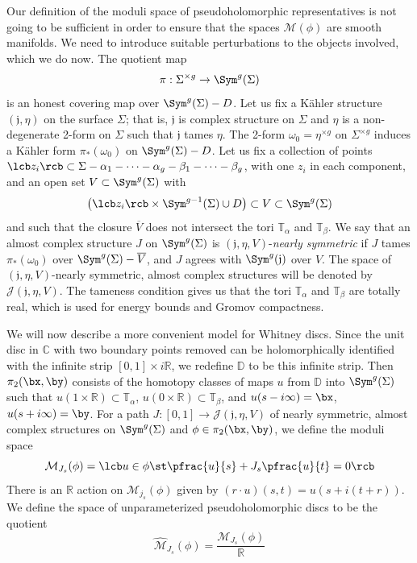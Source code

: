 Our definition of the moduli space of pseudoholomorphic representatives is not going to be sufficient in order to ensure that the spaces $\mathcal M(\phi)$ are smooth manifolds. We need to introduce suitable perturbations to the objects involved, which we do now. The quotient map
\[ \pi : \Sigma^{\times g} \rightarrow \Sym^g(\Sigma) \]
is an honest covering map over $\Sym^g(\Sigma) - D$. 
Let us fix a K\"{a}hler structure $(\mathfrak j,\eta)$ on the surface $\Sigma$; that is, $\mathfrak j$ is complex structure on $\Sigma$ and $\eta$ is a non-degenerate 2-form on $\Sigma$ such that $\mathfrak j$ tames $\eta$. The 2-form $\omega_0 = \eta^{\times g}$ on $\Sigma^{\times g}$ induces a K\"{a}hler form $\pi_*(\omega_0)$ on $\Sym^g(\Sigma) - D$. Let us fix a collection of points $\lcb z_i \rcb \subset \Sigma - \alpha_1 - \cdots - \alpha_g - \beta_1 - \cdots - \beta_g$, with one $z_i$ in each component, and an open set $V \subset \Sym^g(\Sigma)$ with
\[ \left( \lcb z_i \rcb \times \Sym^{g-1}(\Sigma) \cup D \right) \subset V \subset \Sym^g(\Sigma) \]
and such that the closure $\overline V$ does not intersect the tori $\mathbb T_\alpha$ and $\mathbb T_\beta$. We say that an almost complex structure $J$ on $\Sym^g(\Sigma)$ is $(\mathfrak j,\eta,V)$-\emph{nearly symmetric} if $J$ tames $\pi_*(\omega_0)$ over $\Sym^g(\Sigma)-\overline V$, and $J$ agrees with $\Sym^g(\mathfrak j)$ over $V$. The space of $(\mathfrak j,\eta,V)$-nearly symmetric, almost complex structures will be denoted by $\mathcal J(\mathfrak j,\eta,V)$. The tameness condition gives us that the tori $\mathbb T_\alpha$ and $\mathbb T_\beta$ are totally real, which is used for energy bounds and Gromov compactness.

We will now describe a more convenient model for Whitney discs. Since the unit disc in $\mathbb C$ with two boundary points removed can be holomorphically identified with the infinite strip $[0,1] \times i\mathbb R$, we redefine $\mathbb D$ to be this infinite strip. Then $\pi_2(\bx,\by)$ consists of the homotopy classes of maps $u$ from $\mathbb D$ into $\Sym^g(\Sigma)$ such that $u(1 \times \mathbb R) \subset \mathbb T_\alpha$, $u(0 \times \mathbb R) \subset \mathbb T_\beta$, and $u(s-i\infty)=\bx$, $u(s+i\infty)=\by$. For a path $J : [0,1] \rightarrow \mathcal J(\mathfrak j,\eta,V)$ of nearly symmetric, almost complex structures on $\Sym^g(\Sigma)$ and $\phi \in \pi_2(\bx,\by)$, we define the moduli space
\[ \mathcal M_{J_s}(\phi) = \lcb u \in \phi \st \pfrac{u}{s} + J_s \pfrac{u}{t} = 0 \rcb \]
There is an $\mathbb R$ action on $\mathcal M_{j_s}(\phi)$ given by $(r \cdot u)(s,t) = u(s+i(t+r))$. We define the space of unparameterized pseudoholomorphic discs to be the quotient
\[ \widehat{\mathcal M}_{J_s}(\phi) = \frac{\mathcal M_{J_s}(\phi)}{\mathbb R} \]

